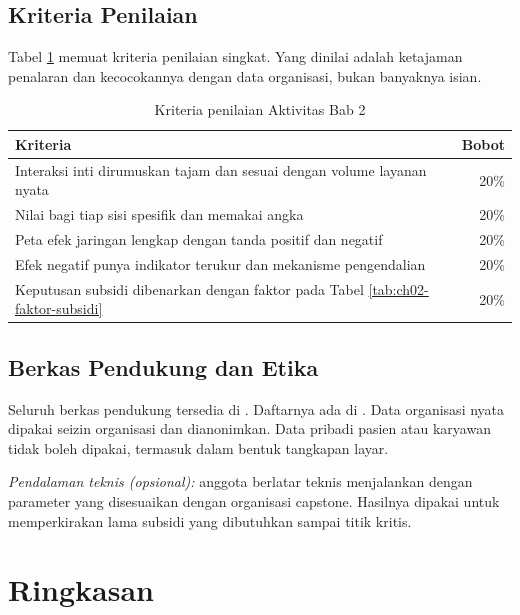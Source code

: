 \subsection*{Kriteria Penilaian}

Tabel \ref{tab:ch02-kriteria} memuat kriteria penilaian singkat. Yang dinilai
adalah ketajaman penalaran dan kecocokannya dengan data organisasi, bukan
banyaknya isian.

\begin{table}[!htb]
  \centering
  \caption{Kriteria penilaian Aktivitas Bab 2}
  \label{tab:ch02-kriteria}
  \begin{tabularx}{\textwidth}{Xr}
    \hline
    \textbf{Kriteria} & \textbf{Bobot} \\
    \hline
    Interaksi inti dirumuskan tajam dan sesuai dengan volume layanan nyata & 20\% \\
    \hline
    Nilai bagi tiap sisi spesifik dan memakai angka & 20\% \\
    \hline
    Peta efek jaringan lengkap dengan tanda positif dan negatif & 20\% \\
    \hline
    Efek negatif punya indikator terukur dan mekanisme pengendalian & 20\% \\
    \hline
    Keputusan subsidi dibenarkan dengan faktor pada Tabel \ref{tab:ch02-faktor-subsidi} & 20\% \\
    \hline
  \end{tabularx}
\end{table}

\subsection*{Berkas Pendukung dan Etika}

Seluruh berkas pendukung tersedia di . Daftarnya
ada di . Data organisasi nyata dipakai
seizin organisasi dan dianonimkan. Data pribadi pasien atau karyawan tidak boleh
dipakai, termasuk dalam bentuk tangkapan layar.

\textit{Pendalaman teknis (opsional):} anggota berlatar teknis menjalankan
 dengan parameter yang
disesuaikan dengan organisasi capstone. Hasilnya dipakai untuk memperkirakan
lama subsidi yang dibutuhkan sampai titik kritis.

\section{Ringkasan}

